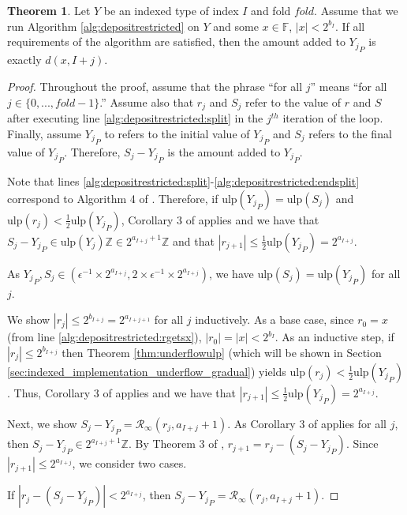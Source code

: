 \documentclass[12pt]{article}
\providecommand{\F}{\ensuremath{\mathbb{F}}}
\providecommand{\Z}{\ensuremath{\mathbb{Z}}}
\providecommand{\ulp}{\ensuremath{\text{ulp}}}
\providecommand{\roundtonearestinfty}{\ensuremath{\mathcal{R}_\text{$\infty$}}}
\theoremstyle{definition}
\newtheorem{thm}{Theorem}[section]
\numberwithin{equation}{section}
\begin{document}
      \begin{thm}
        Let $Y$ be an indexed type of index $I$ and fold $fold$. Assume that we run Algorithm \ref{alg:depositrestricted} on $Y$ and some $x \in \F$, $|x| < 2^{b_I}$. If all requirements of the algorithm are satisfied, then the amount added to ${Y_j}_P$ is exactly $d(x, I + j)$.
        \label{thm:ddepositrestricted}
      \end{thm}
      \begin{proof}
        Throughout the proof, assume that the phrase ``for all $j$'' means ``for all $j \in \{0, ..., fold - 1\}$.'' Assume also that $r_j$ and $S_j$ refer to the value of $r$ and $S$ after executing line \ref{alg:depositrestricted:split} in the $j^{th}$ iteration of the loop. Finally, assume ${Y_j}_P$ to refers to the initial value of ${Y_j}_P$ and $S_j$ refers to the final value of ${Y_j}_P$. Therefore, $S_j - {Y_j}_P$ is the amount added to ${Y_j}_P$.

        Note that lines \ref{alg:depositrestricted:split}-\ref{alg:depositrestricted:endsplit} correspond to Algorithm 4 of \cite{repsum}.
        Therefore, if $\ulp({Y_j}_P) = \ulp(S_j)$ and $\ulp(r_j) < \frac{1}{2}\ulp({Y_j}_P)$, Corollary 3 of \cite{repsum} applies and we have that $S_j - {Y_j}_P \in \ulp({Y_j})\Z \in 2^{a_{I + j} + 1}\Z$ and that $|r_{j + 1}| \leq \frac{1}{2}\ulp({Y_j}_P) = 2^{a_{I + j}}$.

        As ${Y_j}_P, S_j \in (\epsilon^{-1} \times 2^{a_{I + j}}, 2 \times \epsilon^{-1} \times 2^{a_{I + j}})$, we have $\ulp(S_j) = \ulp({Y_j}_P)$ for all $j$.

        We show $|r_j| \leq 2^{b_{I + j}} = 2^{a_{I + j + 1}}$ for all $j$ inductively. As a base case, since $r_0 = x$ (from line \ref{alg:depositrestricted:rgetsx}), $|r_0| = |x| < 2^{b_{I}}$.
        As an inductive step, if $|r_j| \leq 2^{b_{I + j}}$ then Theorem \ref{thm:underflowulp} (which will be shown in Section \ref{sec:indexed_implementation_underflow_gradual}) yields $\ulp(r_j) < \frac{1}{2}\ulp({Y_j}_P)$. Thus, Corollary 3 of \cite{repsum} applies and we have that $|r_{j + 1}| \leq \frac{1}{2}\ulp({Y_j}_P) = 2^{a_{I + j}}$.

        Next, we show $S_j - {Y_j}_P = \roundtonearestinfty(r_j, a_{I + j} + 1)$. As Corollary 3 of \cite{repsum} applies for all $j$, then $S_j - {Y_j}_P \in 2^{a_{I + j} + 1}\Z$. By Theorem 3 of \cite{repsum}, $r_{j + 1} = r_j - (S_j - {Y_j}_P)$. Since $|r_{j + 1}| \leq 2^{a_{I + j}}$, we consider two cases.

        If $|r_j - (S_j - {Y_j}_P)| < 2^{a_{I + j}}$, then $S_j - {Y_j}_P = \roundtonearestinfty(r_j, a_{I + j} + 1)$.


\end{proof}
\end{document}
